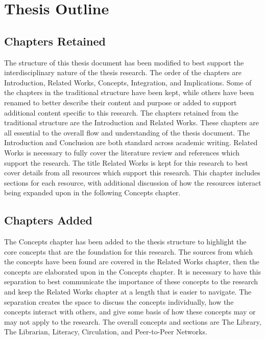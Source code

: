 \section{Thesis Outline}
\label{sec:outline}

\subsection{Chapters Retained}

The structure of this thesis document has been modified to best support the interdisciplinary nature of the thesis research. The order of the chapters are Introduction, Related Works, Concepts, Integration, and Implications. Some of the chapters in the traditional structure have been kept, while others have been renamed to better describe their content and purpose or added to support additional content specific to this research. The chapters retained from the traditional structure are the Introduction and Related Works. These chapters are all essential to the overall flow and understanding of the thesis document. The Introduction and Conclusion are both standard across academic writing. Related Works is necessary to fully cover the literature review and references which support the research. The title Related Works is kept for this research to best cover details from all resources which support this research. This chapter includes sections for each resource, with additional discussion of how the resources interact being expanded upon in the following Concepts chapter.

\subsection{Chapters Added}

The Concepts chapter has been added to the thesis structure to highlight the core concepts that are the foundation for this research. The sources from which the concepts have been found are covered in the Related Works chapter, then the concepts are elaborated upon in the Concepts chapter. It is necessary to have this separation to best communicate the importance of these concepts to the research and keep the Related Works chapter at a length that is easier to navigate. The separation creates the space to discuss the concepts individually, how the concepts interact with others, and give some basis of how these concepts may or may not apply to the research. The overall concepts and sections are The Library, The Librarian, Literacy, Circulation, and Peer-to-Peer Networks. 

